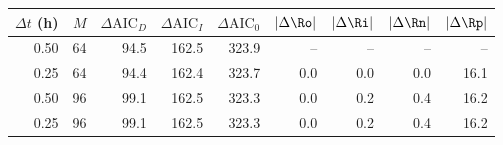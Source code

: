 \begin{tabular}{@{}rrrrrrrrr@{}}
\toprule
$\Delta t$ (h) & $M$ & $\Delta\mathrm{AIC}_D$ & $\Delta\mathrm{AIC}_I$ & $\Delta\mathrm{AIC}_0$ & $|\Delta\Ro|$ & $|\Delta\Ri|$ & $|\Delta\Rn|$ & $|\Delta\Rp|$ \\
\midrule
0.50 & 64 & 94.5 & 162.5 & 323.9 & -- & -- & -- & -- \\
0.25 & 64 & 94.4 & 162.4 & 323.7 & 0.0 & 0.0 & 0.0 & 16.1 \\
0.50 & 96 & 99.1 & 162.5 & 323.3 & 0.0 & 0.2 & 0.4 & 16.2 \\
0.25 & 96 & 99.1 & 162.5 & 323.3 & 0.0 & 0.2 & 0.4 & 16.2 \\
\bottomrule
\end{tabular}